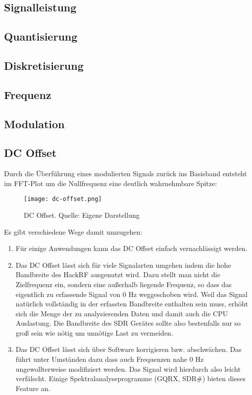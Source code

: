 \subsection{Signalleistung}
\subsection{Quantisierung}
\subsection{Diskretisierung}
\subsection{Frequenz}
\subsection{Modulation}
\subsection{DC Offset}
Durch die Überführung eines modulierten Signals zurück ins Basisband entsteht im FFT-Plot um die Nullfrequenz eine deutlich wahrnehmbare Spitze:
\begin{figure}[ht]
	\centering
	\texttt{[image: dc-offset.png]}
	\caption[DC Offset]{DC Offset. Quelle: Eigene Darstellung} 
	\label{dc-offset}
\end{figure}

Es gibt verschiedene Wege damit umzugehen:
\begin{enumerate}
	\item Für einige Anwendungen kann das DC Offset einfach vernachlässigt werden.
	\item Das DC Offset lässt sich für viele Signalarten umgehen indem die hohe Bandbreite des HackRF ausgenutzt wird. 
	Dazu stellt man nicht die Zielfrequenz ein, sondern eine außerhalb liegende Frequenz, so dass das eigentlich zu erfassende Signal von 0 Hz  weggeschoben wird. Weil das Signal natürlich vollständig in der erfassten Bandbreite enthalten sein muss, erhöht sich die Menge der zu analysierenden Daten und damit auch die CPU Auslastung. Die Bandbreite des SDR Gerätes sollte also bestenfalls nur so groß sein wie nötig um unnötige Last zu vermeiden.
	\item Das DC Offset lässt sich über Software korrigieren bzw. abschwächen. Das führt unter Umständen dazu dass auch Frequenzen nahe 0 Hz ungewollterweise modifiziert werden. Das Signal wird hierdurch also leicht verfälscht. Einige Spektralanalyseprogramme (GQRX, SDR\#) bieten dieses Feature an.
\end{enumerate}

